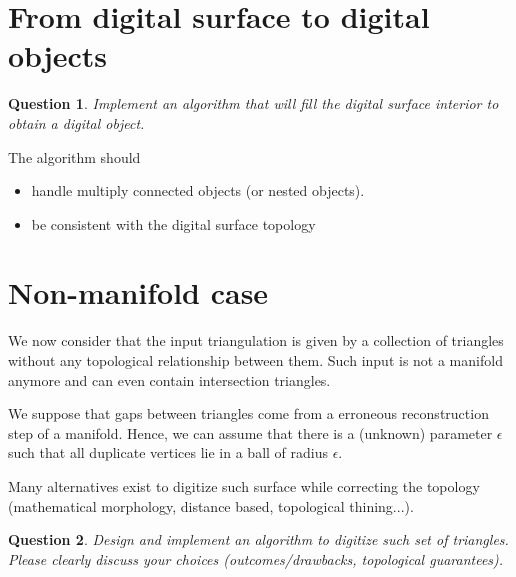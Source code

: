 \documentclass[a4paper, 11pt]{article}
\newtheorem{qu}{Question}
\begin{document}
\section{From digital surface to digital objects}

\begin{qu}
  Implement an algorithm that will fill the digital surface interior
  to obtain a digital object. 
\end{qu}

The algorithm should
\begin{itemize}
\item handle multiply connected objects (or nested objects).
\item be consistent with the digital surface topology 
\end{itemize}


\section{Non-manifold case}

We now consider that the input triangulation is given by a
collection of triangles without any topological relationship between
them. Such input is not a manifold anymore and can even contain
intersection triangles.

We suppose that gaps between triangles come from a erroneous
reconstruction step of a manifold. Hence, we can assume that there is
a (unknown) parameter $\epsilon$ such that all duplicate vertices lie
in a ball of radius $\epsilon$.

Many alternatives exist to digitize such surface while correcting the
topology (mathematical morphology, distance based, topological
thining...).

\begin{qu}
  Design and implement an algorithm to digitize such set of
  triangles. Please clearly discuss your choices (outcomes/drawbacks,
  topological guarantees).
\end{qu}

\nocite{Cohen-Or1997,Schwarz2010,Laine2013}



\end{document}
